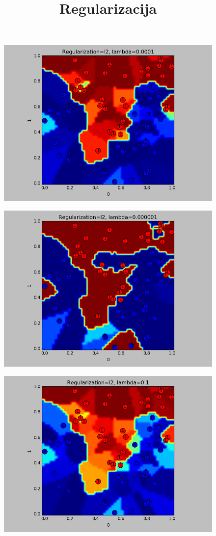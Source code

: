 \documentclass[]{article}
\title{Regularizacija}
\begin{document}
	


	\begin{figure}
		\centering
		\includegraphics[clip,scale=0.35]{myplot2}
	\end{figure}
	\begin{figure}
		\centering
		\includegraphics[clip,scale=0.35]{myplot3}
	\end{figure}
	
	\begin{figure}
		\centering
		\includegraphics[clip,scale=0.35]{myplot4}
	\end{figure}
		

	
	
	
	
\end{document}
